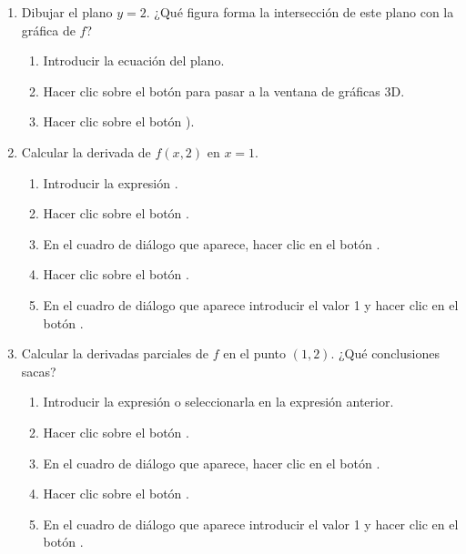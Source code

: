 \begin{enumerate}[leftmargin=*]
\begin{enumerate}
\item Dibujar el plano $y=2$. ¿Qué figura forma la intersección de este plano con la gráfica de $f$?
\begin{indicacion}
\begin{enumerate}
\item Introducir la ecuación del plano.
\item Hacer clic sobre el botón  para pasar a la ventana de gráficas 3D.
\item Hacer clic sobre el botón ).
\end{enumerate}
\end{indicacion}

\item Calcular la derivada de $f(x,2)$ en $x=1$.
\begin{indicacion}
\begin{enumerate}
\item Introducir la expresión .
\item Hacer clic sobre el botón .
\item En el cuadro de diálogo que aparece, hacer clic en el botón .
\item Hacer clic sobre el botón .
\item En el cuadro de diálogo que aparece introducir el valor 1 y hacer clic en el botón .
\end{enumerate}
\end{indicacion}

\item Calcular la derivadas parciales de $f$ en el punto $(1,2)$. ¿Qué conclusiones sacas?
\begin{indicacion}
\begin{enumerate}
\item Introducir la expresión  o seleccionarla en la expresión anterior. 
\item Hacer clic sobre el botón .
\item En el cuadro de diálogo que aparece, hacer clic en el botón .
\item Hacer clic sobre el botón .
\item En el cuadro de diálogo que aparece introducir el valor 1 y hacer clic en el botón .
\end{enumerate}
\end{indicacion}
\end{enumerate}



\end{enumerate}
